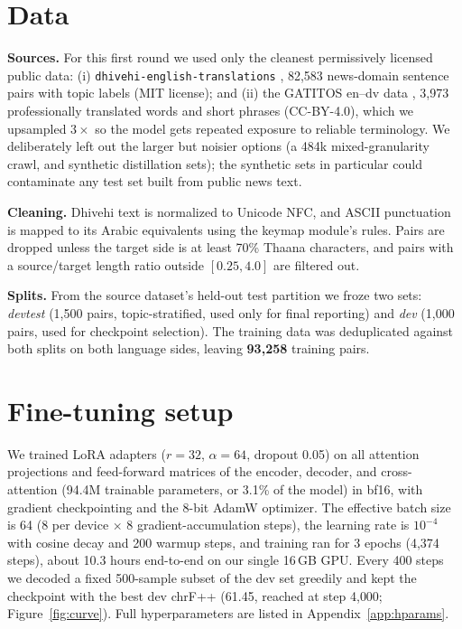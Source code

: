 \documentclass[10pt,twocolumn]{article}
\begin{document}
\section{Data}
\label{sec:data}

\textbf{Sources.} For this first round we used only the cleanest
permissively licensed public data: (i) \texttt{dhivehi-english-translations}
\citep{dhivehienglishtranslations}, 82{,}583 news-domain sentence pairs
with topic labels (MIT license); and (ii) the GATITOS en--dv data
\citep{gatitos,smol}, 3{,}973 professionally translated words and short
phrases (CC-BY-4.0), which we upsampled $3\times$ so the model gets
repeated exposure to reliable terminology. We deliberately left out the
larger but noisier options (a 484k mixed-granularity crawl, and synthetic
distillation sets); the synthetic sets in particular could contaminate any
test set built from public news text.

\textbf{Cleaning.} Dhivehi text is normalized to Unicode NFC, and ASCII
punctuation is mapped to its Arabic equivalents using the keymap module's
rules. Pairs are dropped unless the target side is at least 70\% Thaana
characters, and pairs with a source/target length ratio outside
$[0.25, 4.0]$ are filtered out.

\textbf{Splits.} From the source dataset's held-out test partition we froze
two sets: \emph{devtest} (1{,}500 pairs, topic-stratified, used only for
final reporting) and \emph{dev} (1{,}000 pairs, used for checkpoint
selection). The training data was deduplicated against both splits on both
language sides, leaving \textbf{93{,}258} training pairs.

\section{Fine-tuning setup}
\label{sec:setup}

We trained LoRA \citep{lora} adapters ($r{=}32$, $\alpha{=}64$, dropout
0.05) on all attention projections and feed-forward matrices of the
encoder, decoder, and cross-attention (94.4M trainable parameters, or
3.1\% of the model) in bf16, with gradient checkpointing and the 8-bit
AdamW optimizer. The effective batch size is 64 (8 per device $\times$ 8
gradient-accumulation steps), the learning rate is $10^{-4}$ with cosine
decay and 200 warmup steps, and training ran for 3 epochs (4{,}374 steps),
about 10.3 hours end-to-end on our single 16\,GB GPU. Every 400 steps we
decoded a fixed 500-sample subset of the dev set greedily and kept the
checkpoint with the best dev chrF++ (61.45, reached at step 4{,}000;
Figure~\ref{fig:curve}). Full hyperparameters are listed in
Appendix~\ref{app:hparams}.
\end{document}

